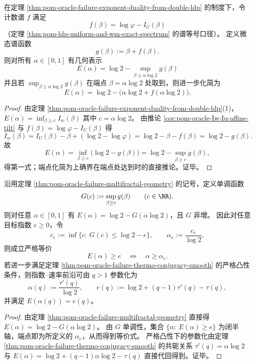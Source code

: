 \begin{theorem}\label{thm:pom-oracle-failure-multifractal-geometry}
在定理 \ref{thm:pom-oracle-failure-exponent-duality-from-double-ldp} 的制度下，令计数谱 \(f\) 满足
\[
f(\beta)=\log\varphi-I_U(\beta)
\]
（定理 \ref{thm:pom-ldp-uniform-and-wm-exact-spectrum} 的谱等号口径）。
定义微态谱函数
\[
g(\beta):=\beta+f(\beta).
\]
则对所有 \(\alpha\in[0,1]\) 有几何表示
\[
\boxed{\;
E(\alpha)=\log 2-\sup_{\beta\ge \alpha\log 2} g(\beta)\;}
\]
并且若 \(\sup_{\beta\ge \alpha\log 2}g(\beta)\) 在端点 \(\beta=\alpha\log 2\) 处取到，则进一步化简为
\[
E(\alpha)=\log 2-\bigl(\alpha\log 2+f(\alpha\log 2)\bigr).
\]
\end{theorem}
\begin{proof}
由定理 \ref{thm:pom-oracle-failure-exponent-duality-from-double-ldp}(1)，
\(
E(\alpha)=\inf_{\beta\ge c}I_w(\beta)
\)
其中 \(c=\alpha\log 2\)。
由推论 \ref{cor:pom-oracle-Iw-Iu-affine-tilt} 与 \(f(\beta)=\log\varphi-I_U(\beta)\) 得
\[
I_w(\beta)=I_U(\beta)-\beta+(\log 2-\log\varphi)=\log 2-\beta-f(\beta)=\log 2-g(\beta).
\]
故
\[
E(\alpha)=\inf_{\beta\ge c}\bigl(\log 2-g(\beta)\bigr)=\log 2-\sup_{\beta\ge c}g(\beta),
\]
得第一式；端点化简为上确界在端点处达到时的直接推论。证毕。
\end{proof}

\begin{corollary}\label{cor:pom-oracle-failure-exponent-inverse-design}
沿用定理 \ref{thm:pom-oracle-failure-multifractal-geometry} 的记号，定义单调函数
\[
G(c):=\sup_{\beta\ge c} g(\beta)\qquad(c\in\RR).
\]
则对任意 \(\alpha\in[0,1]\) 有 \(E(\alpha)=\log 2-G(\alpha\log 2)\)，且 \(G\) 非增。
因此对任意目标指数 \(e\ge 0\)，令
\[
c_e:=\inf\bigl\{c:\ G(c)\le \log 2-e\bigr\},
\qquad
\alpha_e:=\frac{c_e}{\log 2},
\]
则成立严格等价
\[
E(\alpha)\ge e\quad\Longleftrightarrow\quad \alpha\ge \alpha_e.
\]
若进一步满足定理 \ref{thm:pom-oracle-failure-thermo-conjugacy-smooth} 的严格凸性条件，则指数--速率前沿可由 \(q>1\) 参数化为
\[
\alpha(q):=\frac{\tau'(q)}{\log 2},
\qquad
e(q):=\log 2+(q-1)\tau'(q)-\tau(q),
\]
并满足 \(E(\alpha(q))=e(q)\)。
\end{corollary}
\begin{proof}
由定理 \ref{thm:pom-oracle-failure-multifractal-geometry} 直接得 \(E(\alpha)=\log 2-G(\alpha\log 2)\)。
由 \(G\) 单调性，集合 \(\{\alpha:\ E(\alpha)\ge e\}\) 为闭半轴，端点即为所定义的 \(\alpha_e\)，从而得到等价式。
严格凸性下的参数化由定理 \ref{thm:pom-oracle-failure-thermo-conjugacy-smooth} 的共轭关系 \(\tau'(q)=\alpha\log 2\) 与 \(E(\alpha)=\log 2+(q-1)\alpha\log 2-\tau(q)\) 直接代回得到。证毕。
\end{proof}

\endinput
